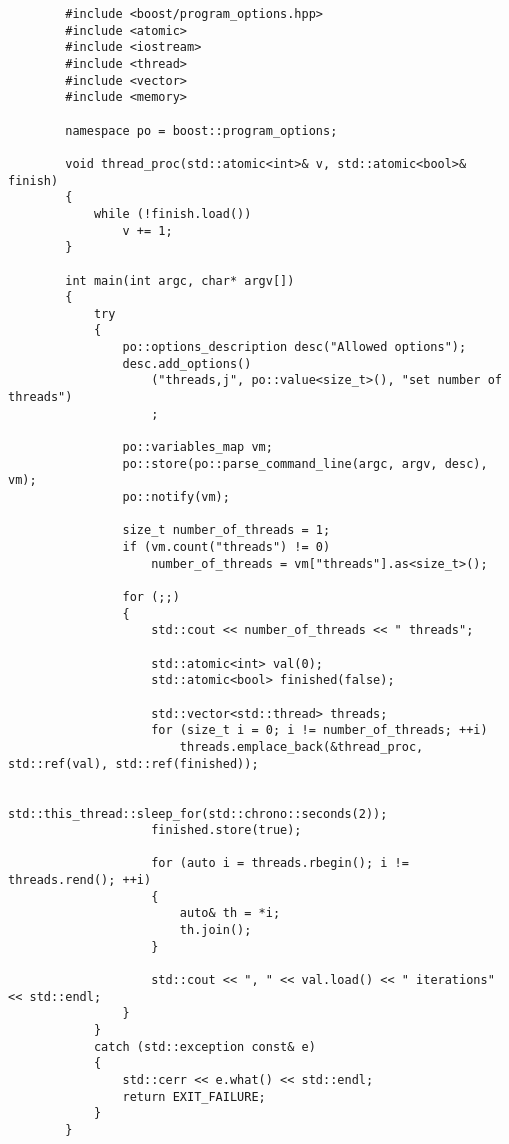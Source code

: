 \documentclass{article}
\begin{document}
    \begin{verbatim}
        #include <boost/program_options.hpp>
        #include <atomic>
        #include <iostream>
        #include <thread>
        #include <vector>
        #include <memory>
        
        namespace po = boost::program_options;
        
        void thread_proc(std::atomic<int>& v, std::atomic<bool>& finish)
        {
            while (!finish.load())
                v += 1;
        }
        
        int main(int argc, char* argv[])
        {
            try
            {
                po::options_description desc("Allowed options");
                desc.add_options()
                    ("threads,j", po::value<size_t>(), "set number of threads")
                    ;
                
                po::variables_map vm;
                po::store(po::parse_command_line(argc, argv, desc), vm);
                po::notify(vm);
                
                size_t number_of_threads = 1;
                if (vm.count("threads") != 0)
                    number_of_threads = vm["threads"].as<size_t>();
                
                for (;;)
                {
                    std::cout << number_of_threads << " threads";
                    
                    std::atomic<int> val(0);
                    std::atomic<bool> finished(false);
                    
                    std::vector<std::thread> threads;
                    for (size_t i = 0; i != number_of_threads; ++i)
                        threads.emplace_back(&thread_proc, std::ref(val), std::ref(finished));
                    
                    std::this_thread::sleep_for(std::chrono::seconds(2));
                    finished.store(true);
                    
                    for (auto i = threads.rbegin(); i != threads.rend(); ++i)
                    {
                        auto& th = *i;
                        th.join();
                    }
                    
                    std::cout << ", " << val.load() << " iterations" << std::endl;
                }
            }
            catch (std::exception const& e)
            {
                std::cerr << e.what() << std::endl;
                return EXIT_FAILURE;
            }
        }
    \end{verbatim}
\end{document}
